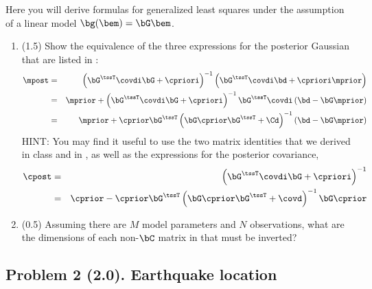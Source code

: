 \documentclass[11pt,titlepage,fleqn]{article}
\begin{document}
Here you will derive formulas for generalized least squares under the assumption of a linear model $\bg(\bem) = \bG\bem$.
%
\begin{enumerate}
\item (1.5) Show the equivalence of the three expressions for the posterior Gaussian that are listed in \citet[][p.~66]{Tarantola2005}:
%
\begin{eqnarray}
\mpost &=& \left(\bG^{\tssT} \covdi \bG + \cpriori \right)^{-1}
\left( \bG^{\tssT} \covdi \bd + \cpriori\mprior \right)
\label{mpost1}
\\
&=& \mprior + \left(\bG^{\tssT} \covdi \bG + \cpriori \right)^{-1} \bG^{\tssT} \covdi \left( \bd - \bG \mprior\right)
\label{mpost2}
\\
&=& \mprior + \cprior \bG^{\tssT} \left( \bG \cprior \bG^{\tssT} + \Cd\right)^{-1} \left( \bd - \bG \mprior\right)
\label{mpost3}
\end{eqnarray}
%
HINT: You may find it useful to use the two matrix identities that we derived in class and in \citet[][Eq.~6.525]{Tarantola2005}, as well as the expressions for the posterior covariance,
%
\begin{eqnarray}
\cpost &=& \left(\bG^{\tssT} \covdi \bG + \cpriori \right)^{-1}
\label{cpost1}
\\
&=& \cprior - \cprior \bG^{\tssT} \left( \bG \cprior \bG^{\tssT} + \covd \right)^{-1} \bG \cprior
\label{cpost2}
\end{eqnarray}

\item (0.5) Assuming there are $M$ model parameters and $N$ observations, what are the dimensions of each non-$\bC$ matrix in  that must be inverted?
\end{enumerate}


\subsection*{Problem 2 (2.0). Earthquake location}
\end{document}
